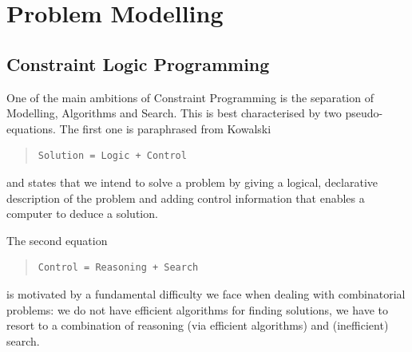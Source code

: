 %
% 
% 
% 
% 
%
%

\chapter{Problem Modelling}


\section{Constraint Logic Programming}

One of the main ambitions of Constraint Programming is the
separation of Modelling, Algorithms and Search.
This is best characterised by two pseudo-equations.
The first one is paraphrased from Kowalski \cite{kowalski79}
\begin{quote}\begin{verbatim}
Solution = Logic + Control
\end{verbatim}\end{quote}
and states that we intend to solve a problem by
giving a logical, declarative description of the problem and
adding control information that enables a computer to deduce a solution.

The second equation
\begin{quote}\begin{verbatim}
Control = Reasoning + Search
\end{verbatim}\end{quote}
is motivated by a fundamental difficulty we face when dealing with
combinatorial problems: we do not have efficient algorithms
for finding solutions, we have to resort to a combination of
reasoning (via efficient algorithms) and (inefficient) search.

